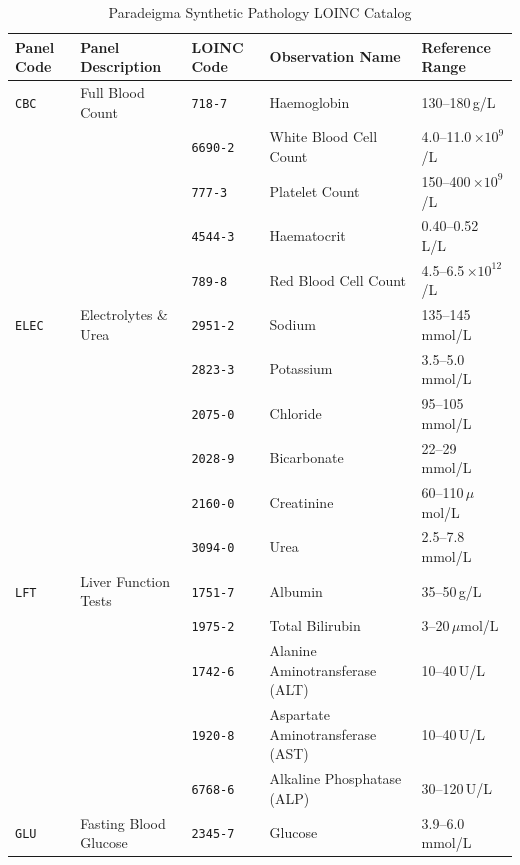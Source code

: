 \begin{table}[htbp]
\centering
\small
\begin{tabularx}{\textwidth}{l l l l l}
\toprule
\textbf{Panel Code} & \textbf{Panel Description} & \textbf{LOINC Code} & \textbf{Observation Name} & \textbf{Reference Range} \\
\midrule
\texttt{CBC} & Full Blood Count & \texttt{718-7} & Haemoglobin & 130--180\,g/L \\
             &                   & \texttt{6690-2} & White Blood Cell Count & 4.0--11.0\,$\times 10^9$/L \\
             &                   & \texttt{777-3} & Platelet Count & 150--400\,$\times 10^9$/L \\
             &                   & \texttt{4544-3} & Haematocrit & 0.40--0.52\,L/L \\
             &                   & \texttt{789-8} & Red Blood Cell Count & 4.5--6.5\,$\times 10^{12}$/L \\
\midrule
\texttt{ELEC} & Electrolytes \& Urea & \texttt{2951-2} & Sodium & 135--145\,mmol/L \\
              &                      & \texttt{2823-3} & Potassium & 3.5--5.0\,mmol/L \\
              &                      & \texttt{2075-0} & Chloride & 95--105\,mmol/L \\
              &                      & \texttt{2028-9} & Bicarbonate & 22--29\,mmol/L \\
              &                      & \texttt{2160-0} & Creatinine & 60--110\,$\mu$mol/L \\
              &                      & \texttt{3094-0} & Urea & 2.5--7.8\,mmol/L \\
\midrule
\texttt{LFT} & Liver Function Tests & \texttt{1751-7} & Albumin & 35--50\,g/L \\
             &                      & \texttt{1975-2} & Total Bilirubin & 3--20\,$\mu$mol/L \\
             &                      & \texttt{1742-6} & Alanine Aminotransferase (ALT) & 10--40\,U/L \\
             &                      & \texttt{1920-8} & Aspartate Aminotransferase (AST) & 10--40\,U/L \\
             &                      & \texttt{6768-6} & Alkaline Phosphatase (ALP) & 30--120\,U/L \\
\midrule
\texttt{GLU} & Fasting Blood Glucose & \texttt{2345-7} & Glucose & 3.9--6.0\,mmol/L \\
\bottomrule
\end{tabularx}
\caption{Paradeigma Synthetic Pathology LOINC Catalog}
\label{tab:loinc_catalog}
\end{table}

